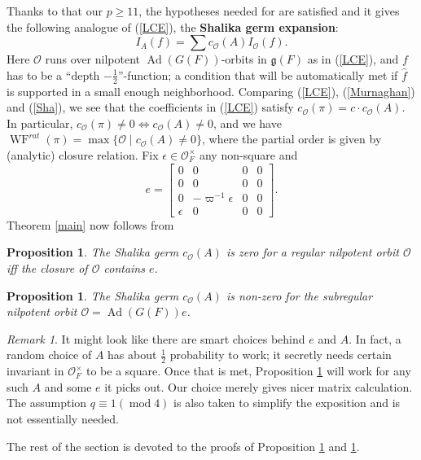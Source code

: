\documentclass[11pt]{amsart}
\newtheorem{proposition}[theorem]{Proposition}
\theoremstyle{remark}
\newtheorem{remark}[theorem]{Remark}
\newcommand{\cO}{\mathcal{O}}
\newcommand{\Ad}{\operatorname{Ad}}
\newcommand{\fg}{\mathfrak{g}}
\newcommand{\matr}[1]{\left[\begin{matrix}#1\end{matrix}\right]}
\newcommand{\WF}{\operatorname{WF}}
\begin{document}
Thanks to that our $p\ge 11$, the hypotheses needed for \cite[Thm 2.1.5]{De02a} are satisfied and it gives the following analogue of (\ref{LCE}), the {\bf Shalika germ expansion}:
\begin{equation}\label{Sha}
I_A(f)=\sum c_{\cO}(A)I_{\cO}(f).
\end{equation}
Here $\cO$ runs over nilpotent $\Ad(G(F))$-orbits in $\fg(F)$ as in (\ref{LCE}), and $f$ has to be a ``depth $-\frac{1}{2}$''-function; a condition that will be automatically met if $\hat{f}$ is supported in a small enough neighborhood.
Comparing (\ref{LCE}), (\ref{Murnaghan}) and (\ref{Sha}), we see that the coefficients in (\ref{LCE}) satisfy $c_{\cO}(\pi)=c\cdot c_{\cO}(A)$. In particular, $c_{\cO}(\pi)\not=0\Leftrightarrow c_{\cO}(A)\not=0$, and we have $\WF^{rat}(\pi)=\max\{\cO\;|\;c_{\cO}(A)\not=0\}$, where the partial order is given by (analytic) closure relation. Fix $\epsilon\in\cO_F^{\times}$ any non-square and
\begin{equation}\label{e}
	e=\matr{0&0&0&0\\0&0&0&0\\0&-\varpi^{-1}\epsilon&0&0\\\epsilon&0&0&0}.
\end{equation}
Theorem \ref{main} now follows from
\begin{proposition}\label{prop:reg} The Shalika germ $c_{\cO}(A)$ is zero for a regular nilpotent orbit $\cO$ iff the closure of $\cO$ contains $e$.
\end{proposition}

\begin{proposition}\label{prop:sub} The Shalika germ $c_{\cO}(A)$ is non-zero for the subregular nilpotent orbit $\cO=\Ad(G(F))e$.
\end{proposition}

\begin{remark} It might look like there are smart choices behind $e$ and $A$. In fact, a random choice of $A$ has about $\frac{1}{2}$ probability to work; it secretly needs certain invariant in $\cO_F^{\times}$ to be a square. Once that is met, Proposition \ref{prop:sub} will work for any such $A$ and some $e$ it picks out. Our choice merely gives nicer matrix calculation. The assumption $q\equiv1(\operatorname{mod}4)$ is also taken to simplify the exposition and is not essentially needed.
\end{remark}

The rest of the section is devoted to the proofs of Proposition \ref{prop:reg} and \ref{prop:sub}.
\end{document}
